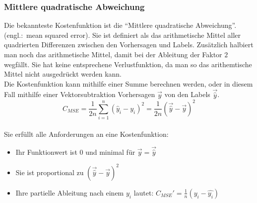 \subsubsection{Mittlere quadratische Abweichung}
Die bekannteste Kostenfunktion ist die ``Mittlere quadratische Abweichung''.
(engl.:\ mean squared error). Sie ist definiert als das arithmetische Mittel
aller quadrierten Differenzen zwischen den Vorhersagen und Labels.
Zusätzlich halbiert man noch das arithmetische Mittel, damit bei der Ableitung der Faktor
$2$ wegfällt. Sie hat keine entsprechene Verlustfunktion, da man so das
arithemtische Mittel nicht ausgedrückt werden kann.
\\
Die Kostenfunktion kann mithilfe einer Summe berechnen werden, oder in
diesem Fall mithilfe einer Vektorsubtraktion Vorhersagen $\vec{y}$ von den Labels $\vec{\hat{y}}$.
\\
\begin{equation}\label{eq:MSE}
  C_{MSE} = \frac{1}{2n}\sum_{i=1}^{n}{(\hat{y}_i - y_i)}^2 = \frac{1}{2n}{(\vec{\hat{y}} - \vec{y})}^2
\end{equation}
\\
Sie erfüllt alle Anforderungen an eine Kostenfunktion:
\begin{itemize}
\item{Ihr Funktionwert ist 0 und minimal für $\vec{y} = \vec{\hat{y}}$}
\item{Sie ist proportional zu ${(\vec{\hat{y}}-\vec{y})}^2$}
\item{Ihre partielle Ableitung nach einem $y_i$ lautet: $C_{MSE}'=\frac{1}{n}(y_i-\hat{y_i})$}
\end{itemize}


